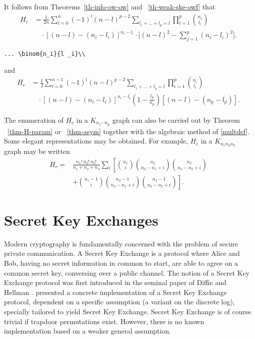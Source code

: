 \documentclass[mlq,fleqn]{w-art}
\begin{document}
It follows from Theorems~\ref{th-info-ow-ow} and
~\ref{th-weak-ske-owf} that
\begin{equation}\label{e:barwq}
\begin{split}
H_c&=\frac1{2n}
\sum^n_{{l}=0}(-1)^{l}(n-{l})^{p-2}
\sum_{l _1+\dots+l _p=l}\prod^p_{i=1}
\binom{n_i}{l _i}\\
&\quad\cdot[(n-l )-(n_i-l _i)]^{n_i-l _i}\cdot
\biggl[(n-l )^2-\sum^p_{j=1}(n_i-l _i)^2\biggr].\end{split}
\end{equation}
\begin{verbatim}
... \binom{n_i}{l _i}\\
\end{verbatim}
and
\begin{equation}\label{joe}
\begin{split}
H_c&=\frac12\sum^{n-1}_{l =0}
(-1)^{l}(n-l )^{p-2}
\sum_{l _1+\dots+l _p=l}
\prod^p_{i=1}\binom{n_i}{l _i}\\
&\quad\cdot[(n-l )-(n_i-l _i)]^{n_i-l _i}
\left(1-\frac{l _p}{n_p}\right)
[(n-l )-(n_p-l _p)].
\end{split}
\end{equation}

The enumeration of $H_c$ in a $K_{n_1\dotsm n_p}$ graph can also be
carried out by Theorem ~\ref{thm-H-param} or ~\ref{thm-asym}
together with the algebraic method of \eqref{multdef}.
Some elegant representations may be obtained. For example, $H_c$ in
a $K_{n_1n_2n_3}$ graph may be written
\begin{equation}\label{j:mark}
\begin{split}
H_c=&
\frac{n_1!\,n_2!\,n_3!}
{n_1+n_2+n_3}\sum_i\left[\binom{n_1}{i}
\binom{n_2}{n_3-n_1+i}\binom{n_3}{n_3-n_2+i}\right.\\
&+\left.\binom{n_1-1}{i}
\binom{n_2-1}{n_3-n_1+i}
\binom{n_3-1}{n_3-n_2+i}\right].\end{split}
\end{equation}

\section{Secret Key Exchanges}
\label{SKE}

Modern cryptography is fundamentally concerned with the problem of
secure private communication.  A Secret Key Exchange is a protocol
where Alice and Bob, having no secret information in common to start,
are able to agree on a common secret key, conversing over a public
channel.  The notion of a Secret Key Exchange protocol was first
introduced in the seminal paper of Diffie and Hellman
\cite{dihe:newdir}. \cite{dihe:newdir} presented a concrete
implementation of a Secret Key Exchange protocol, dependent on a
specific assumption (a variant on the discrete log), specially
tailored to yield Secret Key Exchange. Secret Key Exchange is of
course trivial if trapdoor permutations exist. However, there is no
known implementation based on a weaker general assumption.
\end{document}
